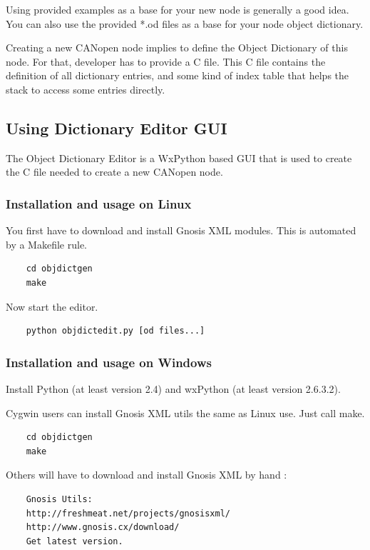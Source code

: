 \documentclass[12pt,english,a4paper]{book}
\newcommand{\canopen}{CANopen }
\begin{document}
Using provided examples as a base for your new node is generally a
good idea. You can also use the provided {*}.od files as a base for
your node object dictionary.

Creating a new \canopen node implies to define the Object Dictionary
of this node. For that, developer has to provide a C file. This C
file contains the definition of all dictionary entries, and some kind
of index table that helps the stack to access some entries directly.


\subsection{Using Dictionary Editor GUI}

The Object Dictionary Editor is a WxPython based GUI that is used
to create the C file needed to create a new \canopen node.


\subsubsection{Installation and usage on Linux}

You first have to download and install Gnosis XML modules. This is
automated by a Makefile rule.

\begin{verbatim}
	cd objdictgen 
	make
\end{verbatim}

Now start the editor.

\begin{verbatim}
	python objdictedit.py [od files...]
\end{verbatim}


\subsubsection{Installation and usage on Windows}

Install Python (at least version 2.4) and wxPython (at least version
2.6.3.2).

Cygwin users can install Gnosis XML utils the same as Linux use. Just
call make.

\begin{verbatim}
	cd objdictgen
	make
\end{verbatim}

Others will have to download and install Gnosis XML by hand :

\begin{verbatim}
	Gnosis Utils:
	http://freshmeat.net/projects/gnosisxml/
	http://www.gnosis.cx/download/
	Get latest version.
\end{verbatim}
\end{document}
